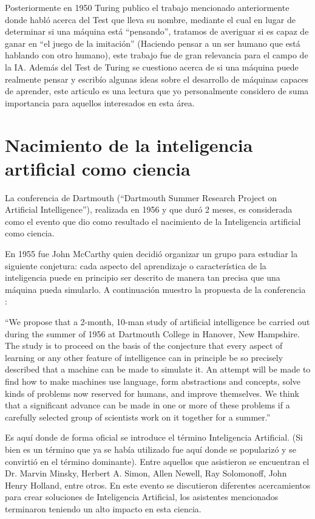 \documentclass[11pt,fleqn]{book} %
\begin{document}
Posteriormente en 1950 Turing publico el trabajo mencionado anteriormente donde habló acerca del Test que lleva su nombre, mediante el cual en lugar de determinar si una máquina está “pensando”, tratamos de averiguar si es capaz de ganar en “el juego de la imitación” (Haciendo pensar a un ser humano que está hablando con otro humano), este trabajo fue de gran relevancia para el campo de la IA. Además del Test de Turing se cuestiono acerca de si una máquina puede realmente pensar y escribío algunas ideas sobre el desarrollo de máquinas capaces de aprender, este articulo es una lectura que yo personalmente considero de suma importancia para aquellos interesados en esta área.

\section{Nacimiento de la inteligencia artificial como ciencia}

La conferencia de Dartmouth (“Dartmouth Summer Research Project on Artificial Intelligence”), realizada en 1956 y que duró 2 meses, es considerada como el evento que dio como resultado el nacimiento de la Inteligencia artificial como ciencia. 

En 1955 fue John McCarthy quien decidió organizar un grupo para estudiar la siguiente conjetura: cada aspecto del aprendizaje o característica de la inteligencia puede en principio ser descrito de manera tan precisa que una máquina pueda simularlo. A continuación muestro la propuesta de la conferencia \cite{DARTHMOUTH}: 

“We propose that a 2-month, 10-man study of artificial intelligence be carried out during the summer of 1956 at Dartmouth College in Hanover, New Hampshire. The study is to proceed on the basis of the conjecture that every aspect of learning or any other feature of intelligence can in principle be so precisely described that a machine can be made to simulate it. An attempt will be made to find how to make machines use language, form abstractions and concepts, solve kinds of problems now reserved for humans, and improve themselves. We think that a significant advance can be made in one or more of these problems if a carefully selected group of scientists work on it together for a summer.” 

Es aquí donde de forma oficial se introduce el término Inteligencia Artificial. (Si bien es un término que ya se había utilizado fue aquí donde se popularizó y se convirtió en el término dominante). Entre aquellos que asistieron se encuentran el Dr. Marvin Minsky, Herbert A. Simon, Allen Newell, Ray Solomonoff, John Henry Holland, entre otros. En este evento se discutieron diferentes acercamientos para crear soluciones de Inteligencia Artificial, los asistentes mencionados terminaron teniendo un alto impacto en esta ciencia.
\end{document}
